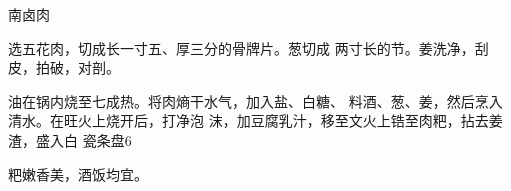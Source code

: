 \begin{recipe}{南卤肉}

\ingredients




\cooking

\step 选五花肉，切成长一寸五、厚三分的骨牌片。葱切成 两寸长的节。姜洗净，刮皮，拍破，对剖。

\step 油在锅内烧至七成热。将肉熵干水气，加入盐、白糖、 料酒、葱、姜，然后烹入清水。在旺火上烧开后，打净泡 沫，加豆腐乳汁，移至文火上锆至肉粑，拈去姜渣，盛入白 瓷条盘6

\notes

粑嫩香美，酒饭均宜。

\end{recipe}

